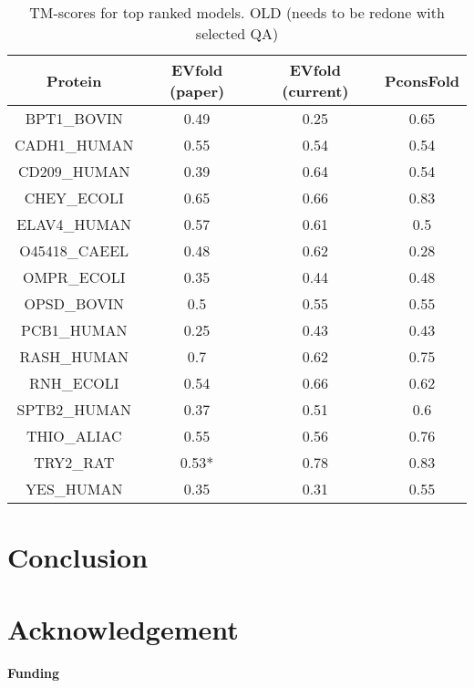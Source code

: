 \documentclass{bioinfo}
\begin{document}
\begin{table}
\caption{TM-scores for top ranked models. OLD (needs to be redone with selected QA)}
    \begin{tabular}{cccc}
    Protein      & EVfold (paper) & EVfold (current) & PconsFold \\ \hline
    BPT1\_BOVIN  & 0.49   & 0.25           & 0.65      \\
    CADH1\_HUMAN & 0.55   & 0.54           & 0.54      \\
    CD209\_HUMAN & 0.39   & 0.64           & 0.54      \\
    CHEY\_ECOLI  & 0.65   & 0.66           & 0.83      \\
    ELAV4\_HUMAN & 0.57   & 0.61           & 0.5       \\
    O45418\_CAEEL & 0.48   & 0.62           & 0.28      \\
    OMPR\_ECOLI  & 0.35   & 0.44           & 0.48      \\
    OPSD\_BOVIN  & 0.5    & 0.55           & 0.55      \\
    PCB1\_HUMAN  & 0.25   & 0.43           & 0.43      \\
    RASH\_HUMAN  & 0.7    & 0.62           & 0.75      \\
    RNH\_ECOLI   & 0.54   & 0.66           & 0.62      \\
    SPTB2\_HUMAN & 0.37   & 0.51           & 0.6       \\
    THIO\_ALIAC  & 0.55   & 0.56           & 0.76      \\
    TRY2\_RAT    & 0.53*  & 0.78           & 0.83      \\
    YES\_HUMAN   & 0.35   & 0.31           & 0.55      \\
    \end{tabular}
\end{table}

\section{Conclusion}


\section*{Acknowledgement}

\paragraph{Funding\textcolon} %
\end{document}
